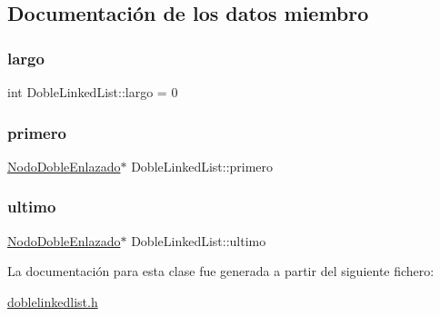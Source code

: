 \subsection{Documentación de los datos miembro}
\mbox{\label{class_doble_linked_list_a4e2387928a3bc6d85baf2ab22578d964}} 
\subsubsection{\texorpdfstring{largo}{largo}}
{\footnotesize\ttfamily int Doble\+Linked\+List\+::largo = 0}

\mbox{\label{class_doble_linked_list_a5651f51045898d3e272ec95287188c7e}} 
\subsubsection{\texorpdfstring{primero}{primero}}
{\footnotesize\ttfamily \mbox{\hyperlink{class_nodo_doble_enlazado}{Nodo\+Doble\+Enlazado}}$\ast$ Doble\+Linked\+List\+::primero}

\mbox{\label{class_doble_linked_list_a214e9f144816aeab27d51ccf5c4b4e24}} 
\subsubsection{\texorpdfstring{ultimo}{ultimo}}
{\footnotesize\ttfamily \mbox{\hyperlink{class_nodo_doble_enlazado}{Nodo\+Doble\+Enlazado}}$\ast$ Doble\+Linked\+List\+::ultimo}



La documentación para esta clase fue generada a partir del siguiente fichero\+:\begin{DoxyCompactItemize}
\item 
\mbox{\hyperlink{doblelinkedlist_8h}{doblelinkedlist.\+h}}\end{DoxyCompactItemize}
